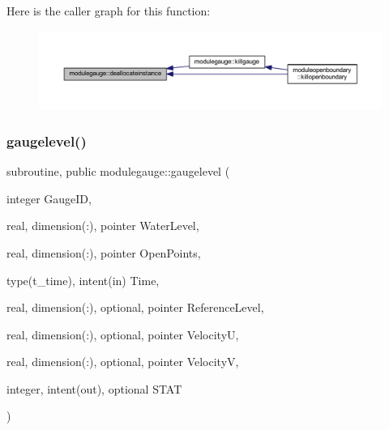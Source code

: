 Here is the caller graph for this function\+:\nopagebreak
\begin{figure}[H]
\begin{center}
\leavevmode
\includegraphics[width=350pt]{namespacemodulegauge_a9e3c4492d77966e5e963fad0f376379f_icgraph}
\end{center}
\end{figure}
\mbox{\label{namespacemodulegauge_a40e51c18500557c90968e17a5ec8a550}} 
\subsubsection{\texorpdfstring{gaugelevel()}{gaugelevel()}}
{\footnotesize\ttfamily subroutine, public modulegauge\+::gaugelevel (\begin{DoxyParamCaption}\item[{integer}]{Gauge\+ID,  }\item[{real, dimension(\+:), pointer}]{Water\+Level,  }\item[{real, dimension(\+:), pointer}]{Open\+Points,  }\item[{type(t\+\_\+time), intent(in)}]{Time,  }\item[{real, dimension(\+:), optional, pointer}]{Reference\+Level,  }\item[{real, dimension(\+:), optional, pointer}]{VelocityU,  }\item[{real, dimension(\+:), optional, pointer}]{VelocityV,  }\item[{integer, intent(out), optional}]{S\+T\+AT }\end{DoxyParamCaption})}

